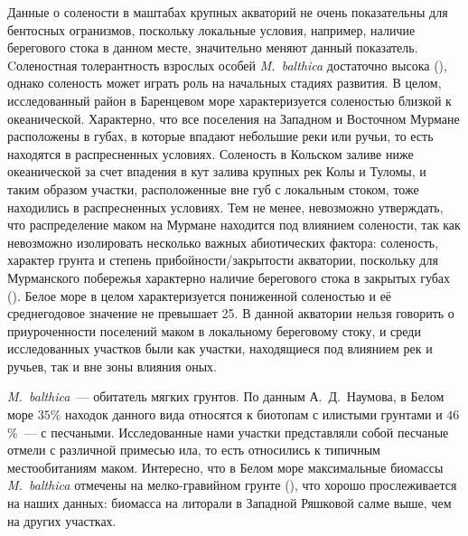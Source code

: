 Данные о солености в маштабах крупных акваторий не очень показательны для бентосных огранизмов, поскольку локальные условия, например, наличие берегового стока в данном месте, значительно меняют данный показатель. 
Cоленостная толерантность взрослых особей {\it M.~balthica} достаточно высока (\cite{Naumov_2006}), однако соленость может играть роль на начальных стадиях развития.
В целом, исследованный район в Баренцевом море характеризуется соленостью близкой к океанической.
Характерно, что все поселения на Западном и Восточном Мурмане расположены в губах, в которые впадают небольшие реки или ручьи, то есть находятся в распресненных условиях.
Соленость в Кольском заливе ниже океанической за счет впадения в кут залива крупных рек Колы и Туломы, и таким образом участки, расположенные вне губ с локальным стоком, тоже находились в распресненных условиях.
Тем не менее, невозможно утверждать, что распределение маком на Мурмане находится под влиянием солености, так как невозможно изолировать несколько важных абиотических фактора: соленость, характер грунта и степень прибойности/закрытости акватории, поскольку для Мурманского побережья характерно наличие берегового стока в закрытых губах (\cite{Guryanova_Ushakov_1929, Guryanova_et_al_1930}).
Белое море в целом характеризуется пониженной соленостью и её среднегодовое значение не превышает 25\permil.
В данной акватории нельзя говорить о приуроченности поселений маком в локальному береговому стоку, и среди исследованных участков были как участки, находящиеся под влиянием рек и ручьев, так и вне зоны влияния оных.

\textit{M.~balthica}~--- обитатель мягких грунтов.
По данным А.~Д.~Наумова, в Белом море $35$\% находок данного вида относятся к биотопам с илистыми грунтами и $46$\%~--- с песчаными. 
Исследованные нами участки представляли собой песчаные отмели с различной примесью ила, то есть относились к типичным местообитаниям маком.
Интересно, что в Белом море максимальные биомассы \textit{M.~balthica} отмечены на мелко-гравийном грунте (\cite{Naumov_2006}), что хорошо прослеживается на наших данных: биомасса на литорали в Западной Ряшковой салме выше, чем на других участках.

\afterpage{\clearpage}

